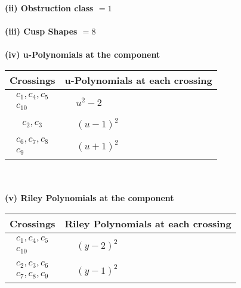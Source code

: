 \documentclass[1p]{elsarticle_modified}
\theoremstyle{definition}
\begin{document}
\flushleft \textbf{(ii) Obstruction class $= 1$}\\~\\
\flushleft \textbf{(iii) Cusp Shapes $= 8$}\\~\\
\newpage\renewcommand{\arraystretch}{1}
\flushleft \textbf{(iv) u-Polynomials at the component}\newline \\
\begin{tabular}{m{50pt}|m{274pt}}
Crossings & \hspace{64pt}u-Polynomials at each crossing \\
\hline $$\begin{aligned}c_{1},c_{4},c_{5}\\c_{10}\end{aligned}$$&$\begin{aligned}
&u^2-2
\end{aligned}$\\
\hline $$\begin{aligned}c_{2},c_{3}\end{aligned}$$&$\begin{aligned}
&(u-1)^2
\end{aligned}$\\
\hline $$\begin{aligned}c_{6},c_{7},c_{8}\\c_{9}\end{aligned}$$&$\begin{aligned}
&(u+1)^2
\end{aligned}$\\
\hline
\end{tabular}\\~\\
\newpage\renewcommand{\arraystretch}{1}
\flushleft \textbf{(v) Riley Polynomials at the component}\newline \\
\begin{tabular}{m{50pt}|m{274pt}}
Crossings & \hspace{64pt}Riley Polynomials at each crossing \\
\hline $$\begin{aligned}c_{1},c_{4},c_{5}\\c_{10}\end{aligned}$$&$\begin{aligned}
&(y-2)^2
\end{aligned}$\\
\hline $$\begin{aligned}c_{2},c_{3},c_{6}\\c_{7},c_{8},c_{9}\end{aligned}$$&$\begin{aligned}
&(y-1)^2
\end{aligned}$\\
\hline
\end{tabular}\\~\\
\end{document}
